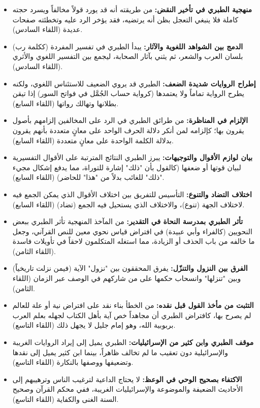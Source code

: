 \begin{itemize}
    \item \textbf{منهجية الطبري في تأخير النقض:} من طريقته أنه قد يورد قولاً مخالفاً ويسرد حجته كاملة فلا ينبغي التعجل بظن أنه يرتضيه، فقد يؤخر الرد عليه وتخطئته صفحات عديدة (اللقاء السادس).
    \item \textbf{الدمج بين الشواهد اللغوية والآثار:} يبدأ الطبري في تفسير المفردة (ككلمة رب) بلسان العرب والشعر، ثم يثني بآثار الصحابة، ليجمع بين التفسير اللغوي والأثري (اللقاء السادس).
    \item \textbf{إطراح الروايات شديدة الضعف:} الطبري قد يروي الضعيف للاستئناس اللغوي، ولكنه يطرح الرواية تماماً ولا يعتمدها (كرواية حساب الجُمَّل في فواتح السور) إذا تيقن بطلانها وتهالك رواتها (اللقاء السابع).
    \item \textbf{الإلزام في المناظرة:} من طرائق الطبري في الرد على المخالفين إلزامهم بأصول يقرون بها؛ كإلزامه لمن أنكر دلالة الحرف الواحد على معانٍ متعددة بأنهم يقرون بدلالة الكلمة الواحدة على معانٍ متعددة (اللقاء السابع).
    \item \textbf{بيان لوازم الأقوال والتوجيهات:} يبرز الطبري النتائج المترتبة على الأقوال التفسيرية لبيان قوتها أو ضعفها (كالقول بأن "ذلك" إشارة للتوراة، مما يدفع إشكال مجيء "ذلك" للغائب بدلاً من "هذا" للحاضر) (اللقاء السابع).
    \item \textbf{اختلاف التضاد والتنوع:} التأسيس للتفريق بين اختلاف الأقوال الذي يمكن الجمع فيه لاختلاف الجهة (تنوع)، والاختلاف الذي يستحيل فيه الجمع (تضاد) (اللقاء السابع).
    \item \textbf{تأثر الطبري بمدرسة النحاة في التقدير:} من المآخذ المنهجية تأثر الطبري ببعض النحويين (كالفراء وأبي عبيدة) في افتراض قياس نحوي معين للنص القرآني، وجعل ما خالفه من باب الحذف أو الزيادة، مما استغله المتكلمون لاحقاً في تأويلات فاسدة (اللقاء الثامن).
    \item \textbf{الفرق بين النزول والتنزّل:} يفرق المحققون بين "نزول" الآية (فيمن نزلت تاريخياً) وبين "تنزلها" وانسحاب حكمها على من شاركهم في الوصف عبر الزمان (اللقاء الثامن).
    \item \textbf{التثبت من مأخذ القول قبل نقده:} من الخطأ بناء نقد على افتراض نية أو علة للعالم لم يصرح بها، كافتراض الطبري أن مجاهداً خص آية بأهل الكتاب لجهله بعلم العرب بربوبية الله، وهو إمام جليل لا يجهل ذلك (اللقاء التاسع).
    \item \textbf{موقف الطبري وابن كثير من الإسرائيليات:} الطبري يميل إلى إيراد الروايات الغريبة والإسرائيلية دون تعقيب ما لم تخالف ظاهراً، بينما ابن كثير يميل إلى نقدها وتضعيفها ووصفها بالنكارة (اللقاء التاسع).
    \item \textbf{الاكتفاء بصحيح الوحي في الوعظ:} لا يحتاج الداعية لترغيب الناس وترهيبهم إلى الأحاديث الضعيفة والموضوعة والإسرائيليات الغريبة، ففي محكم القرآن وصحيح السنة الغنى والكفاية (اللقاء التاسع).

\end{itemize}
